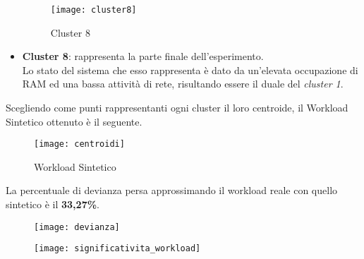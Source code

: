 \begin{itemize}
  \clearpage

  \begin{figure}[!htbp]
    \centering
    \texttt{[image: cluster8]}
    \caption{Cluster 8}
    \label{cluster8}
  \end{figure}

  \item \textbf{Cluster 8}: rappresenta la parte finale dell'esperimento.\\
  Lo stato del sistema che esso rappresenta è dato da un'elevata occupazione
  di RAM ed una bassa attività di rete, risultando essere il duale del \textit{cluster 1}.\\

\end{itemize}
\clearpage
Scegliendo come punti rappresentanti ogni cluster il loro centroide, il Workload
Sintetico ottenuto è il seguente.
\begin{figure}[!htbp]
  \centering
  \texttt{[image: centroidi]}
  \caption{Workload Sintetico}
  \label{centroidi}
\end{figure}

La percentuale di devianza persa approssimando il workload reale con quello
sintetico è il \textbf{33,27\%}.

\begin{minipage}{\linewidth}
  \centering
  \begin{minipage}{0.48\linewidth}
    \begin{figure}[H]
      \texttt{[image: devianza]}
    \end{figure}
  \end{minipage}
  \begin{minipage}{0.48\linewidth}
    \begin{figure}[H]
      \texttt{[image: significativita\_workload]}
    \end{figure}
  \end{minipage}
\end{minipage}

\clearpage

